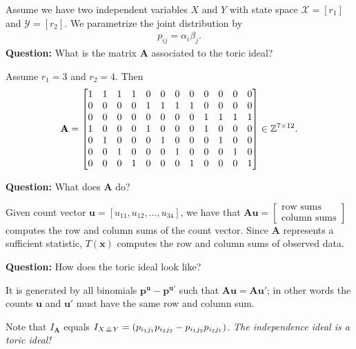 \begin{eg}
  Assume we have two independent variables \( X \) and \( Y \) with state space \( \mathcal{X} = [r_1] \) and \( \mathcal{Y} = [r_2] \). We parametrize the joint distribution by 
  \begin{align*}
    p_{ij} = \alpha_i \beta_j.
  \end{align*}
  \textbf{Question:} What is the matrix \( \mathbf A \) associated to the toric ideal?

  Assume \( r_1 = 3 \) and \( r_2 = 4 \). Then 
  \begin{align*}
    \setcounter{MaxMatrixCols}{20}
    \mathbf A = \begin{bmatrix}
      1 & 1 & 1 & 1& 0 & 0 & 0 & 0 & 0 & 0 & 0 & 0 \\
      0 & 0 & 0 & 0 & 1 & 1 & 1 & 1 & 0 & 0 & 0 & 0 \\
      0 & 0 & 0 & 0 & 0 & 0 & 0 & 0 & 1 & 1& 1& 1 \\
      1 & 0 & 0 & 0 & 1 & 0 & 0 & 0 & 1 & 0 & 0 & 0 \\
      0 & 1 & 0 & 0 & 0 & 1 & 0 & 0 & 0 & 1 & 0 & 0 \\
      0 & 0 & 1 & 0 & 0 & 0 & 1 & 0 & 0 & 0 & 1 & 0 \\
      0 & 0 & 0 & 1 & 0 & 0 & 0 & 1 & 0 & 0 & 0 & 1
    \end{bmatrix} \in \mathbb Z^{7 \times 12}.
  \end{align*}

  \textbf{Question:} What does \( \mathbf A \) do?

  Given count vector \( \mathbf u = [u_{11}, u_{12}, ..., u_{34}] \), we have that \( \mathbf A \mathbf u = \begin{bmatrix}
    \text{row sums} \\ \text{column sums}
  \end{bmatrix} \) computes the row and column sums of the count vector. Since \( \mathbf A \) represents a sufficient statistic, \( T(\mathbf x) \) computes the row and column sums of observed data.

  \textbf{Question:} How does the toric ideal look like?

  It is generated by all binomials \( \mathbf p^{\mathbf u} - \mathbf p^{\mathbf u'} \) such that \( \mathbf A \mathbf u = \mathbf A \mathbf u' \); in other words the counts \( \mathbf u \) and \( \mathbf u' \) must have the same row and column sum.

  Note that \( I_\mathbf A \) equals \( I_{X \perp \!\!\! \perp Y} = (p_{i_1j_1}p_{i_2j_2} - p_{i_1j_2}p_{i_2j_1}) \). \emph{The independence ideal is a toric ideal!}
\end{eg}

